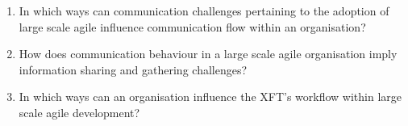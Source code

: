 \begin{enumerate}
   \item In which ways can communication challenges pertaining to the adoption of large scale agile influence communication flow within an organisation?
   
   \item How does communication behaviour in a large scale agile organisation imply information sharing and gathering challenges?
   
   \item In which ways can an organisation influence the XFT's workflow within large scale agile development?
\end{enumerate}